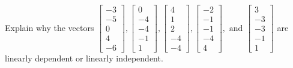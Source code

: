 \documentclass{article}
\begin{document}
\begin{exerciseStatement}
    Explain why the vectors \(\left[\begin{array}{r}
-3 \\
-5 \\
0 \\
4 \\
-6
\end{array}\right] , \left[\begin{array}{r}
0 \\
-4 \\
-4 \\
-1 \\
1
\end{array}\right] , \left[\begin{array}{r}
4 \\
1 \\
2 \\
-4 \\
-4
\end{array}\right] , \left[\begin{array}{r}
-2 \\
-1 \\
-1 \\
-4 \\
4
\end{array}\right] , \text{ and } \left[\begin{array}{r}
3 \\
-3 \\
-3 \\
-1 \\
1
\end{array}\right]\) are linearly dependent or linearly independent.


  
\end{exerciseStatement}
\end{document}

